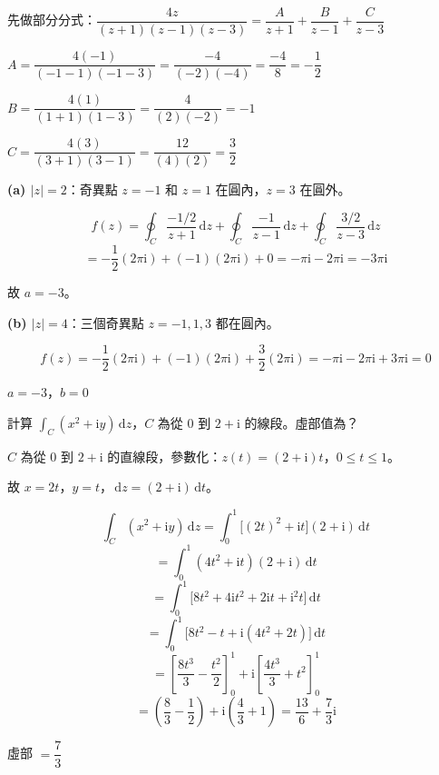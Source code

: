 \documentclass[12pt,a4paper]{article}
\newcommand{\dd}{\,\mathrm{d}}
\newcommand{\ii}{\mathrm{i}}
\begin{document}
\begin{solbox}[解]
先做部分分式：$\dfrac{4z}{(z+1)(z-1)(z-3)}=\dfrac{A}{z+1}+\dfrac{B}{z-1}+\dfrac{C}{z-3}$

$A=\dfrac{4(-1)}{(-1-1)(-1-3)}=\dfrac{-4}{(-2)(-4)}=\dfrac{-4}{8}=-\dfrac{1}{2}$

$B=\dfrac{4(1)}{(1+1)(1-3)}=\dfrac{4}{(2)(-2)}=-1$

$C=\dfrac{4(3)}{(3+1)(3-1)}=\dfrac{12}{(4)(2)}=\dfrac{3}{2}$

\textbf{(a) $|z|=2$}：奇異點 $z=-1$ 和 $z=1$ 在圓內，$z=3$ 在圓外。

$$f(z)=\oint_C\frac{-1/2}{z+1}\dd{z}+\oint_C\frac{-1}{z-1}\dd{z}+\oint_C\frac{3/2}{z-3}\dd{z}$$
$$=-\frac{1}{2}(2\pi\ii)+(-1)(2\pi\ii)+0=-\pi\ii-2\pi\ii=-3\pi\ii$$

故 $a=-3$。

\textbf{(b) $|z|=4$}：三個奇異點 $z=-1,1,3$ 都在圓內。

$$f(z)=-\frac{1}{2}(2\pi\ii)+(-1)(2\pi\ii)+\frac{3}{2}(2\pi\ii)=-\pi\ii-2\pi\ii+3\pi\ii=0$$
\end{solbox}

\begin{ansbox}
$a=\boxed{-3}$，$b=\boxed{0}$
\end{ansbox}

\begin{qbox}[第 3 題 (5-2)]
計算 $\displaystyle\int_C(x^2+\ii y)\dd{z}$，$C$ 為從 $0$ 到 $2+\ii$ 的線段。虛部值為？
\end{qbox}

\begin{solbox}[解]
$C$ 為從 $0$ 到 $2+\ii$ 的直線段，參數化：$z(t)=(2+\ii)t$，$0\le t\le 1$。

故 $x=2t$，$y=t$，$\dd{z}=(2+\ii)\dd{t}$。

$$\int_C(x^2+\ii y)\dd{z}=\int_0^1\bigl[(2t)^2+\ii t\bigr](2+\ii)\dd{t}$$
$$=\int_0^1(4t^2+\ii t)(2+\ii)\dd{t}$$
$$=\int_0^1\bigl[8t^2+4\ii t^2+2\ii t+\ii^2 t\bigr]\dd{t}$$
$$=\int_0^1\bigl[8t^2-t+\ii(4t^2+2t)\bigr]\dd{t}$$
$$=\left[\frac{8t^3}{3}-\frac{t^2}{2}\right]_0^1+\ii\left[\frac{4t^3}{3}+t^2\right]_0^1$$
$$=\left(\frac{8}{3}-\frac{1}{2}\right)+\ii\left(\frac{4}{3}+1\right)=\frac{13}{6}+\frac{7}{3}\ii$$
\end{solbox}

\begin{ansbox}
虛部 $=\boxed{\dfrac{7}{3}}$
\end{ansbox}
\end{document}
